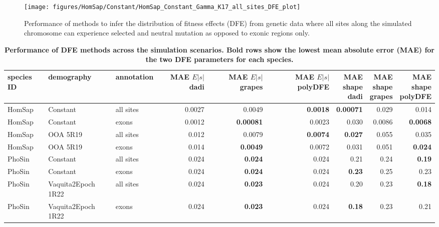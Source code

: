 \documentclass[hidelinks]{article}
\begin{document}
\begin{figure}[h]
    \centering
    \texttt{[image: figures/HomSap/Constant/HomSap\_Constant\_Gamma\_K17\_all\_sites\_DFE\_plot]}
    \caption{
    \label{fig:homsap-dfe.constant.all_sites}
    Performance of methods to infer the distribution of fitness effects (DFE) from genetic data
    where all sites along the simulated chromosome can experience selected and neutral mutation
    as opposed to exonic regions only.
    }
\end{figure}


\begin{table}[ht]
\centering
\small
\caption{\bf{Performance of DFE methods across the simulation scenarios}. 
Bold rows show the lowest mean absolute error (MAE) for the two DFE parameters
for each species.}
\begin{tabular}{lllrrrrrr}
\toprule
species ID & demography & annotation & \makecell{MAE \\ $E|s|$ \\ dadi} & \makecell{MAE \\ $E|s|$ \\ grapes} & \makecell{MAE \\ $E|s|$ \\ polyDFE} & \makecell{MAE \\ shape \\ dadi} & \makecell{MAE \\ shape \\ grapes} & \makecell{MAE \\ shape \\ polyDFE} \\
\midrule
HomSap & Constant & all sites & 0.0027 & 0.0049 & \bf{0.0018} & \bf{0.00071} & 0.029 & 0.014 \\
HomSap & Constant & exons & 0.0012 & \bf{0.00081} & 0.0023 & 0.030 & 0.0086 & \bf{0.0068} \\
HomSap & OOA 5R19 & all sites & 0.012 & 0.0079 & \bf{0.0074} & \bf{0.027} & 0.055 & 0.035 \\
HomSap & OOA 5R19 & exons & 0.014 & \bf{0.0049} & 0.0072 & 0.031 & 0.051 & \bf{0.024} \\
PhoSin & Constant & all sites & 0.024 & \bf{0.024} & 0.024 & 0.21 & 0.24 & \bf{0.19} \\
PhoSin & Constant & exons & 0.024 & \bf{0.024} & 0.024 & \bf{0.23} & 0.25 & 0.23 \\
PhoSin & Vaquita2Epoch 1R22 & all sites & 0.024 & \bf{0.023} & 0.024 & 0.20 & 0.23 & \bf{0.18} \\
PhoSin & Vaquita2Epoch 1R22 & exons & 0.024 & \bf{0.023} & 0.024 & \bf{0.18} & 0.23 & 0.21 \\
\bottomrule
\end{tabular}
\label{tab:dfe_table}
\end{table}
\end{document}
